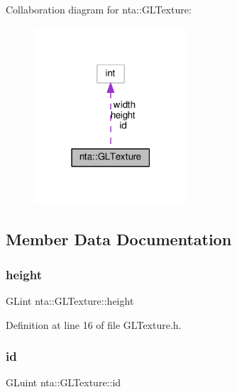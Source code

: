 Collaboration diagram for nta\+:\+:G\+L\+Texture\+:\nopagebreak
\begin{figure}[H]
\begin{center}
\leavevmode
\includegraphics[width=162pt]{d3/d3e/structnta_1_1GLTexture__coll__graph}
\end{center}
\end{figure}


\subsection{Member Data Documentation}
\mbox{\label{structnta_1_1GLTexture_a4ac2e45733ffb16238eb696d663e62a1}} 
\subsubsection{\texorpdfstring{height}{height}}
{\footnotesize\ttfamily G\+Lint nta\+::\+G\+L\+Texture\+::height}



Definition at line 16 of file G\+L\+Texture.\+h.

\mbox{\label{structnta_1_1GLTexture_aaf0d536088f4b1062d996679b217c0f9}} 
\subsubsection{\texorpdfstring{id}{id}}
{\footnotesize\ttfamily G\+Luint nta\+::\+G\+L\+Texture\+::id}



